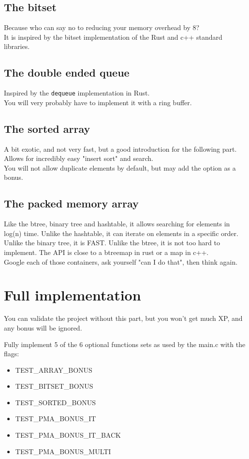 \documentclass{42-en}
\begin{document}
        \subsection{The bitset}
        Because who can say no to reducing your memory overhead by 8?\\
        It is inspired by the bitset implementation of the Rust and c++ standard libraries.

        \subsection{The double ended queue}
        Inspired by the \texttt{dequeue} implementation in Rust.\\
        You will very probably have to implement it with a ring buffer.

        \subsection{The sorted array}
        A bit exotic, and not very fast, but a good introduction for the following part.
        Allows for incredibly easy "insert sort" and search.\\
        You will not allow duplicate elements by default, but may add the option as a bonus.

        \subsection{The packed memory array}
        Like the btree, binary tree and hashtable, it allows searching
        for elements in log(n) time. Unlike the hashtable, it can iterate on elements in
        a specific order. Unlike the binary tree, it is FAST. Unlike the btree,
        it is not too hard to implement. The API is close to a btreemap in rust or a map in c++.\\
        Google each of those containers, ask yourself "can I do that", then think again.

    \section{Full implementation}

        You can validate the project without this part, but you won't get much XP,
        and any bonus will be ignored.

        Fully implement 5 of the 6 optional functions sets as used by the main.c with the flags:
        \begin{itemize}\itemsep1pt
            \item TEST\_ARRAY\_BONUS
            \item TEST\_BITSET\_BONUS
            \item TEST\_SORTED\_BONUS
            \item TEST\_PMA\_BONUS\_IT
            \item TEST\_PMA\_BONUS\_IT\_BACK
            \item TEST\_PMA\_BONUS\_MULTI
        \end{itemize}
\end{document}
